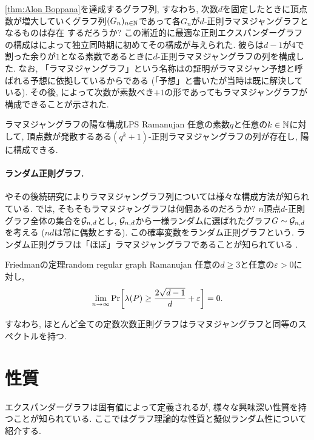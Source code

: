 \cref{thm:Alon Boppana}を達成するグラフ列, すなわち,
次数$d$を固定したときに頂点数が増大していくグラフ列$(G_n)_{n\in\mathbb{N}}$であって各$G_n$が$d$-正則ラマヌジャングラフとなるものは存在
するだろうか?
この漸近的に最適な正則エクスパンダーグラフの構成は\citet{LPS88,Mar88}によって独立同時期に初めてその構成が与えられた.
彼らは$d-1$が$4$で割った余りが$1$となる素数であるときに$d$-正則ラマヌジャングラフの列を構成した.
なお, 「ラマヌジャングラフ」という名称は\cite{LPS88}の証明がラマヌジャン予想と呼ばれる予想に依拠しているからである
(「予想」と書いたが当時は既に解決している).
その後, \citet{Mor94}によって次数が素数べき$+1$の形であってもラマヌジャングラフが構成できることが示された.
\begin{theorem}{ラマヌジャングラフの陽な構成}{LPS Ramanujan}
    任意の素数$q$と任意の$k\in\mathbb{N}$に対して, 頂点数が発散するある$(q^k+1)$-正則ラマヌジャングラフの列が存在し, 陽に構成できる.
\end{theorem}

\paragraph*{ランダム正則グラフ.}
\citet{LPS88}やその後続研究によりラマヌジャングラフ列については様々な構成方法が知られている.
では, そもそもラマヌジャングラフは何個あるのだろうか?
$n$頂点$d$-正則グラフ全体の集合を$\mathcal{G}_{n,d}$とし,
$\mathcal{G}_{n,d}$から一様ランダムに選ばれたグラフ$G\sim\mathcal{G}_{n,d}$を考える
($nd$は常に偶数とする).
この確率変数をランダム正則グラフという.
ランダム正則グラフは「ほぼ」ラマヌジャングラフであることが知られている
\cite{Friedman_random_regular}.
\begin{theorem}{Friedmanの定理}{random regular graph Ramanujan}
    任意の$d\ge 3$と任意の$\varepsilon > 0$に対し,
    \[ \lim_{n\to\infty}\Pr\sbra*{\lambda(P) \ge \frac{2\sqrt{d-1}}{d} + \varepsilon} = 0. \]
\end{theorem}
すなわち, ほとんど全ての定数次数正則グラフはラマヌジャングラフと同等のスペクトルを持つ.

\section{性質}
エクスパンダーグラフは固有値によって定義されるが, 様々な興味深い性質を持つことが知られている.
ここではグラフ理論的な性質と擬似ランダム性について紹介する.
%


